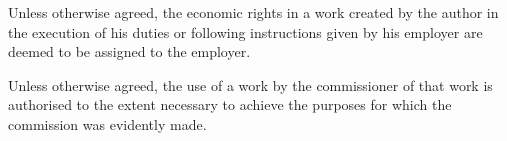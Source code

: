 \begin{contract}
\label{Par:WorksMadeInTheCourseOfEmployment}
\Sentence Unless otherwise agreed, the economic rights in a work created by the author
in the execution of his duties or following instructions given by his employer
are deemed to be assigned to the employer.

\label{Par:WorksMadeOncommission}
\Sentence Unless otherwise agreed, the use of a work by the commissioner of that work
is authorised to the extent necessary to achieve the purposes for which the
commission was evidently made.

\end{contract}